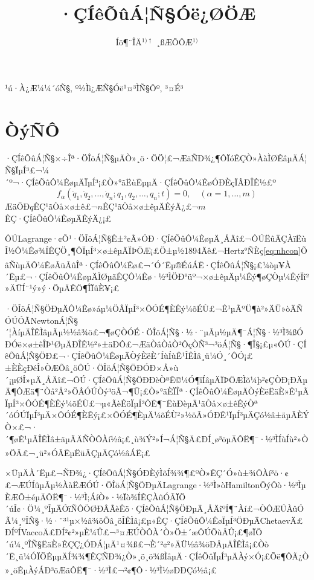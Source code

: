 \documentclass[A4,twoside]{ctexart}
\newcommand{\supercite}[1]{\textsuperscript{\cite{#1}}}
\begin{document}
\apsname

\title{·ÇÍêÕûÁ¦Ñ§Óë¿ØÖÆ\fivestar}

\author{Íõ¶¨ÎÄ$^{1)\dag}$ \quad ¸ßÆÕÔÆ$^{1)}$}
\address{1)}{¹ú·À¿Æ¼¼´óÑ§, º½Ìì¿ÆÑ§Óë¹¤³ÌÑ§Ôº, ³¤É³ }






\section{ÒýÑÔ}
\label{sec:intr}
·ÇÍêÕûÁ¦Ñ§×÷Îª·ÖÎöÁ¦Ñ§µÄÒ»¸ö·ÖÖ¦£¬ÆäÑÐ¾¿¶ÔÏóÊÇÒ»ÀàÌØÊâµÄÁ¦Ñ§ÏµÍ³£¬¼´º¬·ÇÍêÕûÔ¼ÊøµÄÏµÍ³¡£Ò»°ãËùËµµÄ·ÇÍêÕûÔ¼ÊøÓÐÈçÏÂÐÎÊ½£º
\begin{equation}
  \label{eq:nhcon}
  f_{\alpha}(\dot{q}_1,\dot{q}_2,\ldots,\dot{q}_n;q_1,q_2,\ldots,q_n;t)=0,\quad(\alpha=1,\ldots,m)
\end{equation}
ÆäÖÐ$q$ÊÇ¹ãÒå×ø±ê£¬$n$ÊÇ¹ãÒå×ø±êµÄÊýÄ¿£¬$m$ÊÇ·ÇÍêÕûÔ¼ÊøµÄÊýÄ¿¡£

ÔÚLagrange·¢Õ¹·ÖÎöÁ¦Ñ§Ê±²¢Ã»ÓÐ·ÇÍêÕûÔ¼ÊøµÄ¸ÅÄî£¬ÔÚËûÄÇÀïËùÎ½Ô¼Êø¾ÍÊÇÖ¸¶ÔÏµÍ³×ø±êµÄÏÞÖÆ¡£Ö±µ½1894Äê£¬Hertz°ÑÈç\eqref{eq:nhcon}ÕâÑùµÄÔ¼ÊøÃüÃûÎª·ÇÍêÕûÔ¼Êø£¬´Ó´Ëµ®ÉúÁË·ÇÍêÕûÁ¦Ñ§\supercite{1}¡£¼òµ¥À´Ëµ£¬·ÇÍêÕûÔ¼ÊøµÄÌØµãÊÇÔ¼Êø·½³ÌÖÐ°üº¬×ø±êµÄµ¼Êý¶øÇÒµ¼ÊýÏî²»ÄÜÍ¨¹ý»ý·ÖµÄÊÖ¶ÎÏûÈ¥¡£

·ÖÎöÁ¦Ñ§ÖÐµÄÔ¼Êø»áµ¼ÖÂÏµÍ³×ÔÓÉ¶ÈÊý¼õÉÙ£¬Ê¹µÃºÜ¶à²»ÄÜ»òÄÑÓÚÓÃNewtonÁ¦Ñ§´¦ÀíµÄÎÊÌâµÃµ½½â¾ö£¬¶øÇÒÓÉ·ÖÎöÁ¦Ñ§·½·¨µÃµ½µÄ¶¯Á¦Ñ§·½³Ì¾ßÓÐÓë×ø±êÎÞ¹ØµÄÐÎÊ½²»±äÐÔ£¬ÆäÒâÒåÒ²ÔçÒÑ³¬³öÁ¦Ñ§·¶Î§¡£µ«ÔÚ·ÇÍêÕûÁ¦Ñ§ÖÐ£¬·ÇÍêÕûÔ¼ÊøµÄÒýÈëÈ´ÍùÍùÊ¹ÎÊÌâ¸ü¼Ó¸´ÔÓ¡£±ÈÈçÐéÎ»ÒÆÕâ¸öÔÚ·ÖÎöÁ¦Ñ§ÖÐÓÐ×Å»ù´¡µØÎ»µÄ¸ÅÄî£¬ÔÚ·ÇÍêÕûÁ¦Ñ§ÖÐÐèÒªÊ©¼Ó¶îÍâµÄÏÞÖÆÌõ¼þ²¢ÇÒÐ¡ÐÄµÄ¶ÔÆä¶¨Òå²Å²»ÖÂÓÚÒý³öÃ¬¶Ü¡£Ò»°ãÈÏÎª·ÇÍêÕûÔ¼ÊøµÄÒýÈëËäÈ»Ê¹µÃÏµÍ³×ÔÓÉ¶ÈÊý¼õÉÙ£¬µ«ÃèÊöÏµÍ³ÔË¶¯ËùÐèµÄ¹ãÒå×ø±êÊýÒª´óÓÚÏµÍ³µÄ×ÔÓÉ¶ÈÊý¡£×ÔÓÉ¶ÈµÄ¼õÉÙ²»½öÃ»ÓÐÊ¹ÏµÍ³µÄÇó½â±äµÃÈÝÒ×£¬·´¶øÊ¹µÃÎÊÌâ±äµÃÄÑÒÔÀí½â¡£¸ù¾Ý²»Í¬Á¦Ñ§Ä£ÐÍ¸ø³öµÄÔË¶¯·½³ÌÍùÍù²»Ò»ÖÂ£¬¸ü²»ÓÃËµËüÃÇµÄÇó½âÁË\supercite{2,3,4}¡£

×ÜµÄÀ´Ëµ£¬ÑÐ¾¿·ÇÍêÕûÁ¦Ñ§ÓÐÈýÌõÍ¾¾¶£ºÒ»ÊÇ´Ó»ù±¾Ô­Àí³ö·¢£¬ÆÚÍûµÃµ½ÀàËÆÓÚ·ÖÎöÁ¦Ñ§ÖÐµÄLagrange·½³Ì»òHamiltonÕýÔò·½³ÌµÈÆÕ±éµÄÔË¶¯·½³Ì;ÁíÒ»·½Ïò¾ÍÊÇÀûÓÃÏÖ´úÎ¢·Ö¼¸ºÎµÄÓïÑÔÖØÐÂÃèÊö·ÇÍêÕûÁ¦Ñ§ÖÐµÄ¸ÅÄîºÍ¶¨Àí£¬ÒÔÆÚÀûÓÃ¼¸ºÎÑ§·½·¨³¹µ×½â¾öÕâ¸öÎÊÌâ¡£µ«ÊÇ·ÇÍêÕûÔ¼ÊøÏµÍ³ÖÐµÄChetaevÄ£ÐÍºÍVaccoÄ£ÐÍ²¢²»µÈ¼Û£¬³¤ÆÚÒÔÀ´Ò»Ö±´æÔÚÕùÂÛ¡£¶øÏÖ´ú¼¸ºÎÑ§ËäÈ»ÊÇÇ¿ÓÐÁ¦µÄ¹¤¾ß£¬È´²¢²»ÄÜ½â¾öÐÂµÄÎÊÌâ¡£Òò´Ë¸ü¼ÓÏÖÊµµÄÍ¾¾¶ÊÇÑÐ¾¿Ò»¸ö¸ö¾ßÌåµÄ·ÇÍêÕûÏµÍ³µÄÀý×Ó¡£Õë¶ÔÃ¿Ò»¸öÊµÀýÁÐ³öÆäÔË¶¯·½³Ì£¬²¢¶Ô·½³Ì½øÐÐÇó½â\supercite{5}¡£
\end{document}
